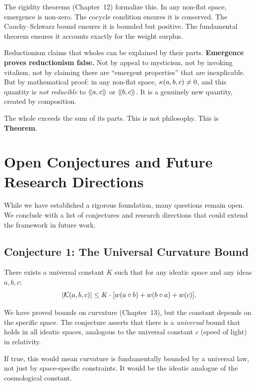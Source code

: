 The rigidity theorems (Chapter~12) formalize this. In any non-flat space,
emergence is non-zero. The cocycle condition ensures it is conserved. The
Cauchy--Schwarz bound ensures it is bounded but positive. The fundamental
theorem ensures it accounts exactly for the weight surplus.

Reductionism claims that wholes can be explained by their parts.
\textbf{Emergence proves reductionism false.} Not by appeal to mysticism, not
by invoking vitalism, not by claiming there are ``emergent properties'' that
are inexplicable. But by mathematical proof: in any non-flat space,
$\kappa(a, b, c) \neq 0$, and this quantity is \emph{not reducible} to
$\langle\!\langle a, c \rangle\!\rangle$ or $\langle\!\langle b, c \rangle\!\rangle$. It is a genuinely new quantity, created by
composition.

The whole exceeds the sum of its parts. This is not philosophy. This is
\textbf{Theorem}.


\section{Open Conjectures and Future Research Directions}

While we have established a rigorous foundation, many questions remain open.
We conclude with a list of conjectures and research directions that could
extend the framework in future work.

\subsection{Conjecture 1: The Universal Curvature Bound}

\begin{conjecture}
\label{conj:universal-curvature}
There exists a universal constant $K$ such that for any ideatic space and any
ideas $a, b, c$:
\[
  |\mathcal{K}(a, b, c)| \leq K \cdot [w(a \circ b) + w(b \circ a) + w(c)].
\]
\end{conjecture}

We have proved bounds on curvature (Chapter~13), but the constant depends on
the specific space. The conjecture asserts that there is a \emph{universal}
bound that holds in all ideatic spaces, analogous to the universal constant
$c$ (speed of light) in relativity.

If true, this would mean curvature is fundamentally bounded by a universal
law, not just by space-specific constraints. It would be the ideatic analogue
of the cosmological constant.

